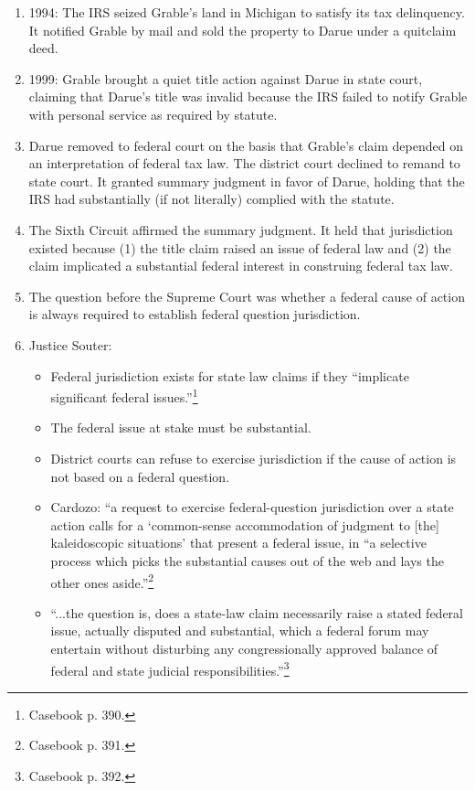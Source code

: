 \begin{enumerate}
    \item 1994: The IRS seized Grable's land in Michigan to satisfy its tax delinquency. It notified Grable by mail and sold the property to Darue under a quitclaim deed.
    \item 1999: Grable brought a quiet title action against Darue in state court, claiming that Darue's title was invalid because the IRS failed to notify Grable with personal service as required by statute.
    \item Darue removed to federal court on the basis that Grable's claim depended on an interpretation of federal tax law. The district court declined to remand to state court. It granted summary judgment in favor of Darue, holding that the IRS had substantially (if not literally) complied with the statute.
    \item The Sixth Circuit affirmed the summary judgment. It held that jurisdiction existed because (1) the title claim raised an issue of federal law and (2) the claim implicated a substantial federal interest in construing federal tax law.
    \item The question before the Supreme Court was whether a federal cause of action is always required to establish federal question jurisdiction.
    \item Justice Souter:
    \begin{itemize}
        \item Federal jurisdiction exists for state law claims if they ``implicate significant federal issues.''\footnote{Casebook p. 390.}
        \item The federal issue at stake must be substantial.
        \item District courts can refuse to exercise jurisdiction if the cause of action is not based on a federal question.
        \item Cardozo: ``a request to exercise federal-question jurisdiction over a state action calls for a `common-sense accommodation of judgment to [the] kaleidoscopic situations' that present a federal issue, in ``a selective process which picks the substantial causes out of the web and lays the other ones aside.''\footnote{Casebook p. 391.}
        \item ``...the question is, does a state-law claim necessarily raise a stated federal issue, actually disputed and substantial, which a federal forum may entertain without disturbing any congressionally approved balance of federal and state judicial responsibilities.''\footnote{Casebook p. 392.}

\end{itemize}
\end{enumerate}
